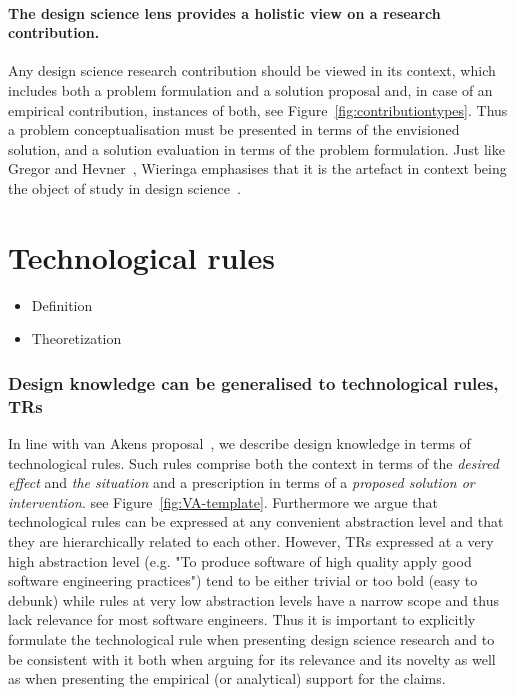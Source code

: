 \documentclass[graybox]{svmult}
\begin{document}
\paragraph{The design science lens provides a holistic view on a research contribution.} 

Any design science research contribution should be viewed in its context, which includes both a problem formulation and a solution proposal and, in case of an empirical contribution, instances of both, see Figure~\ref{fig:contributiontypes}. Thus a problem conceptualisation must be presented in terms of the envisioned solution, and a solution evaluation in terms of the problem formulation. 
Just like Gregor and Hevner~\cite{gregor_positioning_2013}, Wieringa emphasises that it is the artefact in context being the object of study in design science~\cite{wieringa_design_2009}.

\section{Technological rules}
\begin{itemize}
\item Definition
\item Theoretization
\end{itemize}

\subsubsection{Design knowledge can be generalised to technological rules, TRs}
In line with van Akens proposal~\cite{van_aken_management_2004}, we describe design knowledge in terms of technological rules. Such rules comprise both the context in terms of the \emph{desired effect} and \emph{the situation} and a prescription in terms of a \emph{proposed solution or intervention}. see Figure~\ref{fig:VA-template}. Furthermore we argue that technological rules can be expressed at any convenient abstraction level and that they are hierarchically related to each other. However, TRs expressed at a very high abstraction level (e.g. "To produce software of high quality apply good software engineering practices") tend to be either trivial or too bold (easy to debunk) while rules at very low abstraction levels have a narrow scope and thus lack relevance for most software engineers. Thus it is important to explicitly formulate the technological rule when presenting design science research and to be consistent with it both when arguing for its relevance and its novelty as well as when presenting the empirical (or analytical) support for the claims. 
\end{document}
